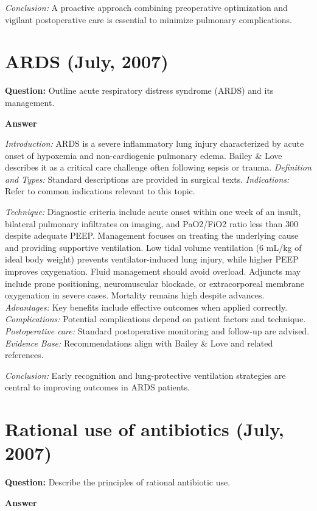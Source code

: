 \documentclass{article}
\begin{document}
\emph{Conclusion:} A proactive approach combining preoperative optimization and vigilant postoperative care is essential to minimize pulmonary complications.


\section{ARDS (July, 2007)}

\textbf{Question:} Outline acute respiratory distress syndrome (ARDS) and its management.

\textbf{Answer}

\emph{Introduction:} ARDS is a severe inflammatory lung injury characterized by acute onset of hypoxemia and non-cardiogenic pulmonary edema. Bailey & Love describes it as a critical care challenge often following sepsis or trauma.
\emph{Definition and Types:} Standard descriptions are provided in surgical texts.
\emph{Indications:} Refer to common indications relevant to this topic.

\emph{Technique:} Diagnostic criteria include acute onset within one week of an insult, bilateral pulmonary infiltrates on imaging, and PaO2/FiO2 ratio less than 300 despite adequate PEEP. Management focuses on treating the underlying cause and providing supportive ventilation. Low tidal volume ventilation (6 mL/kg of ideal body weight) prevents ventilator-induced lung injury, while higher PEEP improves oxygenation. Fluid management should avoid overload. Adjuncts may include prone positioning, neuromuscular blockade, or extracorporeal membrane oxygenation in severe cases. Mortality remains high despite advances.
\emph{Advantages:} Key benefits include effective outcomes when applied correctly.
\emph{Complications:} Potential complications depend on patient factors and technique.
\emph{Postoperative care:} Standard postoperative monitoring and follow-up are advised.
\emph{Evidence Base:} Recommendations align with Bailey & Love and related references.

\emph{Conclusion:} Early recognition and lung-protective ventilation strategies are central to improving outcomes in ARDS patients.


\section{Rational use of antibiotics (July, 2007)}

\textbf{Question:} Describe the principles of rational antibiotic use.

\textbf{Answer}
\end{document}
